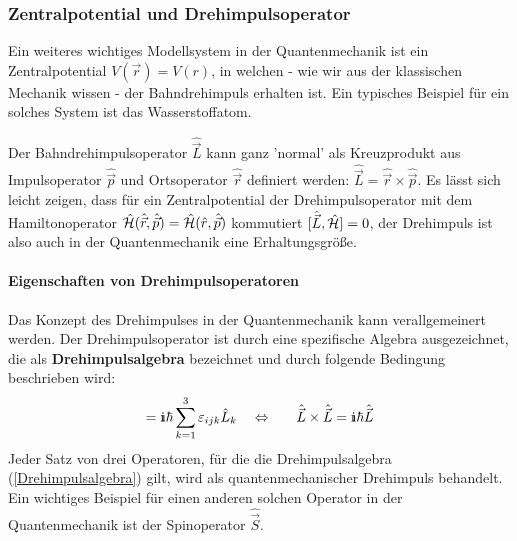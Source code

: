 \subsubsection{Zentralpotential und Drehimpulsoperator}

Ein weiteres wichtiges Modellsystem in der Quantenmechanik ist ein Zentralpotential $V(\vec{r})=V(r)$, in welchen - wie wir aus der klassischen Mechanik wissen - der Bahndrehimpuls erhalten ist. Ein typisches Beispiel für ein solches System ist das Wasserstoffatom. 

Der Bahndrehimpulsoperator $\hat{\vec{L}}$ kann ganz 'normal' als Kreuzprodukt aus Impulsoperator $\hat{\vec{p}}$ und Ortsoperator $\hat{\vec{r}}$ definiert werden: $\hat{\vec{L}}=\hat{\vec{r}} \times \hat{\vec{p}}$. Es lässt sich leicht zeigen, dass für ein Zentralpotential der Drehimpulsoperator mit dem Hamiltonoperator $\hat{\mathcal H}(\hat{\vec{r}},\hat{\vec{p}})=\hat{\mathcal H}(\hat{r},\hat{\vec{p}})$ kommutiert $[\hat{\vec{L}},\hat{\mathcal H}]=0$, der Drehimpuls ist also auch in der Quantenmechanik eine Erhaltungsgröße. 


\paragraph{Eigenschaften von Drehimpulsoperatoren}
Das Konzept des Drehimpulses in der Quantenmechanik kann verallgemeinert werden. Der Drehimpulsoperator ist durch eine spezifische Algebra ausgezeichnet, die als {\bf Drehimpulsalgebra} bezeichnet und durch folgende Bedingung beschrieben wird: 
\begin{eqnarray}
	[\hat{L}_i, \hat{L}_j] = \I\hbar\sum_{k=1}^{3} \varepsilon_{ijk} \hat{L}_k &\quad\Leftrightarrow\quad& \hat{\vec{L}} \times \hat{\vec{L}} = \I\hbar \hat{\vec{L}}	\label{Drehimpulsalgebra}
\end{eqnarray}
Jeder Satz von drei Operatoren, für die die Drehimpulsalgebra (\ref{Drehimpulsalgebra}) gilt, wird als quantenmechanischer Drehimpuls behandelt. Ein wichtiges Beispiel für einen anderen solchen Operator in der Quantenmechanik ist der Spinoperator $\hat{\vec{S}}$. 

